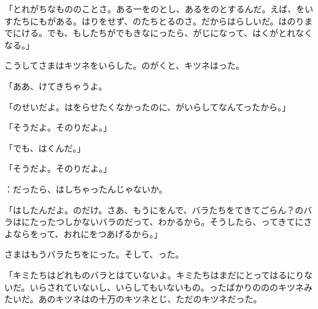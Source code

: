 「とれがちなもののことさ。ある一をのとし、あるをのとするんだ。えば、をいすたちにもがある。はりをせず、のたちとるのさ。だからはらしいだ。はのりまでにける。でも、もしたちがでもきなにったら、がじになって、はくがとれなくなる。」

こうしてさまはキツネをいらした。のがくと、キツネはった。

「ああ、けてきちゃうよ。

「のせいだよ。はをらせたくなかったのに、がいらしてなんてったから。」

「そうだよ。そのりだよ。」

「でも、はくんだ。」

「そうだよ。そのりだよ。」

：だったら、はしちゃったんじゃないか。

「はしたんだよ。のだけ。さあ、もうにをんで、バラたちをてきてごらん？のバラはにたったつしかないバラのだって、わかるから。そうしたら、ってきてにさよならをって、おれにをつあげるから。」

さまはもうバラたちをにった。そして、った。

「キミたちはどれものバラとはていないよ。キミたちはまだにとってはるにりないだ。いらされていないし、いらしてもいないもの。ったばかりのののキツネみたいだ。あのキツネはの十万のキツネとじ、ただのキツネだった。

